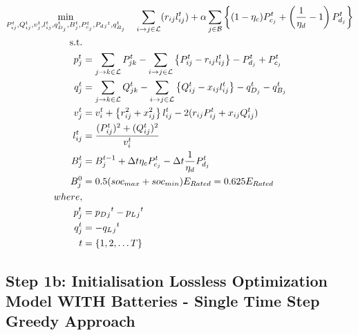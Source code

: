 \begin{gather}
    \min_{P_{ij}^t, Q_{ij}^t, v_{j}^t, l_{ij}^t, q_{D_j}^t, B_{j}^{t},
	P_{c_j}^t, P_d{_j}^t, q_{B_j}^t} \quad
	\sum_{\fromto{i, j} \in \mathcal{L}} (r_{ij}l_{ij}^t) + 
	\alpha \sum_{j \in \mathcal{B}} \left\{ (1- \eta_c)P_{c_j}^t + \left(\frac{1}{\eta_d}-1\right) P_{d_j}^t \right\} \\
	\begin{align}
		\text{s.t.} & {}\nonumber \\
		{p_j^t} & = {\sum_{\fromto{j,k} \in \mathcal{L}} P_{jk}^t - \sum_{\fromto{i,j} \in \mathcal{L}}\left\{P_{ij}^t - r_{ij}l_{ij}^t\right\} - P_{d_j}^t + P_{c_j}^t} && \\
		{q_j^t} & = {\sum_{\fromto{j,k} \in \mathcal{L}} Q_{jk}^t - \sum_{\fromto{i,j} \in \mathcal{L}}\left\{Q_{ij}^t - x_{ij}l_{ij}^t\right\} - q_{D_j}^t - q_{B_j}^t} && \\
		{v_j^t} & = {v_{i}^t +  \left\{r_{ij}^2 + x_{ij}^2\right\}l_{ij}^t - 2(r_{ij}P_{ij}^t + x_{ij}Q_{ij}^t)} && \\
		{l_{ij}^t} & = {\frac{(P_{ij}^{t})^2 + (Q_{ij}^{t})^2}{v_i^t}} \\
		{B_{j}^{t}} &= {B_{j}^{t-1} + \Delta t \eta_c P_{c_j}^t - \Delta t\frac{1}{\eta_d} P_{d_j}^t} \\
		{ B_{j}^{0} } &= { 0.5(soc_{max}+soc_{min})E_{Rated} = 0.625E_{Rated}} \\
		{where,} & {} \\
		{p_j^t} &= {p_D{_j}^t - p_L{_j}^t} \\
		{q_j^t} &= {-q_L{_j}^t} \\
		{t} &= {\{1, 2, \ldots T\}}
	\end{align}
\end{gather}

\subsection*{Step 1b: Initialisation Lossless Optimization Model WITH Batteries - Single Time Step Greedy Approach}


